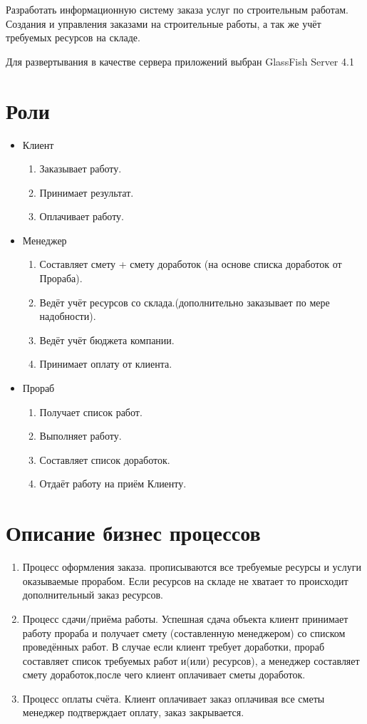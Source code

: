 Разработать информационную систему заказа услуг по строительным работам. Создания и управления заказами на строительные работы, а так же учёт требуемых ресурсов на складе.

Для развертывания в качестве сервера приложений выбран GlassFish Server 4.1
\section{Роли}
\begin{itemize}
\item Клиент
	\begin{enumerate}
	\item Заказывает работу.
	\item Принимает результат.
	\item Оплачивает работу.
	\end{enumerate}
\item Менеджер
	\begin{enumerate}
	\item Составляет смету + смету доработок (на основе списка доработок от Прораба).
	\item Ведёт учёт ресурсов со склада.(дополнительно заказывает по мере надобности).
	\item Ведёт учёт бюджета компании.
	\item Принимает оплату от клиента.
	\end{enumerate}
\item Прораб
	\begin{enumerate}
	\item Получает список работ.
	\item Выполняет работу.
	\item Составляет список доработок.
	\item Отдаёт работу на приём Клиенту.
	\end{enumerate}
\end{itemize}
\newpage
\section{Описание бизнес процессов}
\begin{enumerate}
\item Процесс оформления заказа. прописываются все требуемые ресурсы и услуги оказываемые прорабом. Если ресурсов на складе не хватает то происходит дополнительный заказ ресурсов.
\item Процесс сдачи/приёма работы. Успешная сдача объекта клиент принимает работу прораба и получает смету (составленную менеджером) со списком проведённых работ. В случае если клиент требует доработки, прораб составляет список требуемых работ и(или) ресурсов), а менеджер составляет смету доработок,после чего клиент оплачивает сметы доработок.
\item Процесс оплаты счёта. Клиент оплачивает заказ оплачивая все сметы менеджер подтверждает оплату, заказ закрывается.
\end{enumerate}
